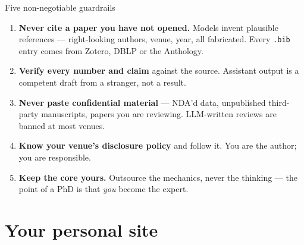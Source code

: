 \documentclass[aspectratio=169,11pt]{beamer}
\newcommand{\code}[1]{\texttt{\small #1}}
\newcommand{\key}[1]{\textbf{\color{brand}#1}}
\begin{document}
\begin{frame}{Five non-negotiable guardrails}
\begin{alertblock}{}
\begin{enumerate}
  \item \key{Never cite a paper you have not opened.} Models invent plausible
        references --- right-looking authors, venue, year, all fabricated.
        Every \code{.bib} entry comes from Zotero, DBLP or the Anthology.
  \item \key{Verify every number and claim} against the source. Assistant
        output is a competent draft from a stranger, not a result.
  \item \key{Never paste confidential material} --- NDA'd data, unpublished
        third-party manuscripts, papers you are reviewing. LLM-written reviews
        are banned at most venues.
  \item \key{Know your venue's disclosure policy} and follow it. You are the
        author; you are responsible.
  \item \key{Keep the core yours.} Outsource the mechanics, never the
        thinking --- the point of a PhD is that \emph{you} become the expert.
\end{enumerate}
\end{alertblock}
\end{frame}

\section{Your personal site}
\end{document}
